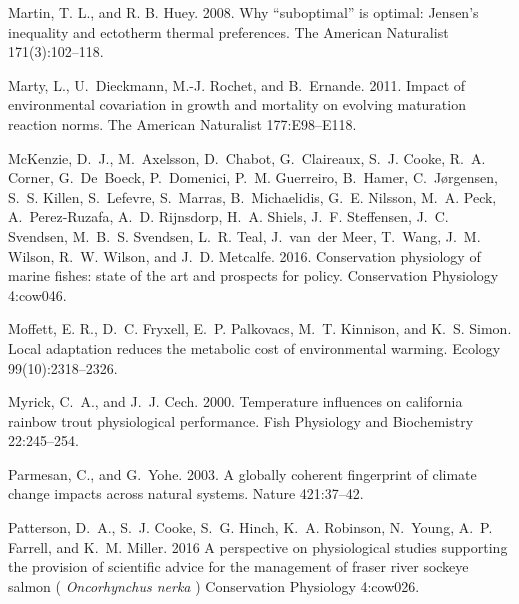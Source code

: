 \documentclass[11pt]{article}\usepackage[]{graphicx}\usepackage[]{color,soul}
\begin{document}
\begin{thebibliography}{55}
Martin, T. L., and R. B. Huey. 2008.
\newblock Why “suboptimal” is optimal: Jensen’s inequality and ectotherm thermal preferences. 
\newblock The American Naturalist 171(3):102--118.

Marty, L., U.~Dieckmann, M.-J. Rochet, and B.~Ernande. 2011.
\newblock Impact of environmental covariation in growth and mortality on
  evolving maturation reaction norms.
\newblock The American Naturalist 177:E98--E118.

{McKenzie}, D.~J., M.~Axelsson, D.~Chabot, G.~Claireaux, S.~J. Cooke, R.~A.
  Corner, G.~De~Boeck, P.~Domenici, P.~M. Guerreiro, B.~Hamer, C.~Jørgensen,
  S.~S. Killen, S.~Lefevre, S.~Marras, B.~Michaelidis, G.~E. Nilsson, M.~A.
  Peck, A.~Perez-Ruzafa, A.~D. Rijnsdorp, H.~A. Shiels, J.~F. Steffensen, J.~C.
  Svendsen, M.~B.~S. Svendsen, L.~R. Teal, J.~van~der Meer, T.~Wang, J.~M.
  Wilson, R.~W. Wilson, and J.~D. Metcalfe. 2016.
\newblock Conservation physiology of marine fishes: state of the art and
  prospects for policy. 
\newblock Conservation Physiology 4:cow046.
  
Moffett, E. R., D.~C. Fryxell, E.~P. Palkovacs, M.~T. Kinnison, and K.~S. Simon.
\newblock Local adaptation reduces the metabolic cost of environmental warming.
\newblock Ecology 99(10):2318--2326.

Myrick, C.~A., and J.~J. Cech. 2000.
\newblock Temperature influences on california rainbow trout physiological
  performance.
\newblock Fish Physiology and Biochemistry 22:245--254.

Parmesan, C., and G.~Yohe. 2003.
\newblock A globally coherent fingerprint of climate change impacts across
  natural systems.
\newblock Nature 421:37--42.

Patterson, D.~A., S.~J. Cooke, S.~G. Hinch, K.~A. Robinson, N.~Young, A.~P.
  Farrell, and K.~M. Miller. 2016
\newblock A perspective on physiological studies supporting the provision of
  scientific advice for the management of fraser river sockeye salmon (
  \textit{Oncorhynchus nerka} )
\newblock Conservation Physiology 4:cow026.


\end{thebibliography}
\end{document}
